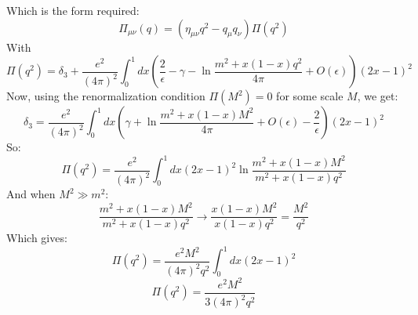 \documentclass{article}
\begin{document}
Which is the form required:
\begin{equation}
    \Pi_{\mu\nu}(q) = (\eta_{\mu\nu}q^2 - q_{\mu}q_{\nu})\Pi(q^2)
\end{equation}
With
\begin{equation}
    \Pi(q^2) = \delta_3 + \frac{e^2}{(4\pi)^2} \int_0^1 dx \left(\frac{2}{\epsilon} - \gamma - \ln \frac{m^2 + x(1 - x)q^2}{4\pi} + O(\epsilon)\right)(2x - 1)^2
\end{equation}
Now, using the renormalization condition $\Pi(M^2) = 0$ for some scale $M$, we get:
\begin{equation}
    \delta_3 = \frac{e^2}{(4\pi)^2} \int_0^1 dx \left(\gamma + \ln \frac{m^2 + x(1 - x)M^2}{4\pi} + O(\epsilon) - \frac{2}{\epsilon}\right)(2x - 1)^2
\end{equation}
So:
\begin{equation}
    \Pi(q^2) = \frac{e^2}{(4\pi)^2} \int_0^1 dx (2x - 1)^2 \ln \frac{m^2 + x(1 - x)M^2}{m^2 + x(1 - x)q^2}
\end{equation}
And when $M^2 \gg m^2$:
\begin{equation}
    \frac{m^2 + x(1 - x)M^2}{m^2 + x(1 - x)q^2} \rightarrow \frac{x(1 - x)M^2}{x(1 - x)q^2} = \frac{M^2}{q^2}
\end{equation}
Which gives:
\begin{equation}
    \Pi(q^2) = \frac{e^2M^2}{(4\pi)^2q^2} \int_0^1 dx (2x - 1)^2
\end{equation}
\begin{equation}
    \Pi(q^2) = \frac{e^2M^2}{3(4\pi)^2q^2}
\end{equation}
\end{document}
